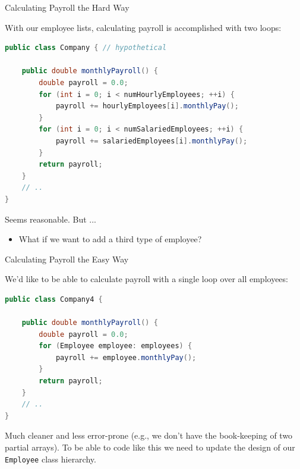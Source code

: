 \documentclass{beamer}
\begin{document}
\begin{frame}[fragile]{Calculating Payroll the Hard Way}


With our employee lists, calculating payroll is accomplished with two loops:
\begin{lstlisting}[language=Java]
public class Company { // hypothetical

    public double monthlyPayroll() {
        double payroll = 0.0;
        for (int i = 0; i < numHourlyEmployees; ++i) {
            payroll += hourlyEmployees[i].monthlyPay();
        }
        for (int i = 0; i < numSalariedEmployees; ++i) {
            payroll += salariedEmployees[i].monthlyPay();
        }
        return payroll;
    }
    // ..
}
\end{lstlisting}
Seems reasonable.  But ...
\begin{itemize}
\item What if we want to add a third type of employee?
\end{itemize}


\end{frame}

\begin{frame}[fragile]{Calculating Payroll the Easy Way}


We'd like to be able to calculate payroll with a single loop over all employees:
\begin{lstlisting}[language=Java]
public class Company4 {

    public double monthlyPayroll() {
        double payroll = 0.0;
        for (Employee employee: employees) {
            payroll += employee.monthlyPay();
        }
        return payroll;
    }
    // ..
}
\end{lstlisting}

Much cleaner and less error-prone (e.g., we don't have the book-keeping of two partial arrays).  To be able to code like this we need to update the design of our {\tt Employee} class hierarchy.


\end{frame}
\end{document}
